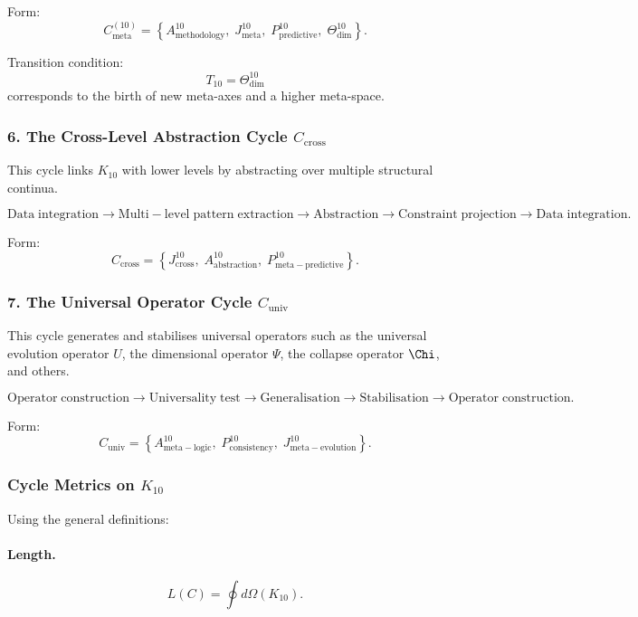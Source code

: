 Form:
\[
  C_{\mathrm{meta}}^{(10)}
   =
   \left\{
     A^{10}_{\mathrm{methodology}},\;
     J^{10}_{\mathrm{meta}},\;
     P^{10}_{\mathrm{predictive}},\;
     \Theta^{10}_{\mathrm{dim}}
   \right\}.
\]

Transition condition:
\[
  T_{10} = \Theta^{10}_{\mathrm{dim}}
\]
corresponds to the birth of new meta-axes and a higher meta-space.


\subsubsection{6. The Cross-Level Abstraction Cycle $C_{\mathrm{cross}}$}

This cycle links $K_{10}$ with lower levels by abstracting over multiple
structural continua.

\[
  \mathrm{Data\;integration}
  \to
  \mathrm{Multi\!-\!level\;pattern\;extraction}
  \to
  \mathrm{Abstraction}
  \to
  \mathrm{Constraint\;projection}
  \to
  \mathrm{Data\;integration}.
\]

Form:
\[
  C_{\mathrm{cross}}
  =
  \left\{
    J^{10}_{\mathrm{cross}},\;
    A^{10}_{\mathrm{abstraction}},\;
    P^{10}_{\mathrm{meta\!-\!predictive}}
  \right\}.
\]


\subsubsection{7. The Universal Operator Cycle $C_{\mathrm{univ}}$}

This cycle generates and stabilises universal operators such as the
universal evolution operator $U$, the dimensional operator $\Psi$, the
collapse operator $\Chi$, and others.

\[
  \mathrm{Operator\;construction}
  \to
  \mathrm{Universality\;test}
  \to
  \mathrm{Generalisation}
  \to
  \mathrm{Stabilisation}
  \to
  \mathrm{Operator\;construction}.
\]

Form:
\[
  C_{\mathrm{univ}}
  =
  \left\{
    A^{10}_{\mathrm{meta\!-\!logic}},\;
    P^{10}_{\mathrm{consistency}},\;
    J^{10}_{\mathrm{meta\!-\!evolution}}
  \right\}.
\]


\subsubsection{Cycle Metrics on $K_{10}$}

Using the general definitions:

\paragraph{Length.}
\[
  L(C) = \oint d\Omega(K_{10}).
\]

